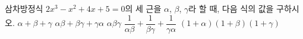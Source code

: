삼차방정식 $2x^3-x^2+4x+5=0$의 세 근을 $\alpha$, $\beta$, $\gamma$라 할 때, 다음 식의 값을 구하시오.
 $\alpha+\beta+\gamma$
 $\alpha\beta+\beta\gamma+\gamma\alpha$
 $\alpha\beta\gamma$
 $\dfrac{1}{\alpha\beta}+\dfrac{1}{\beta\gamma}+\dfrac{1}{\gamma\alpha}$
 $(1+\alpha)(1+\beta)(1+\gamma)$
